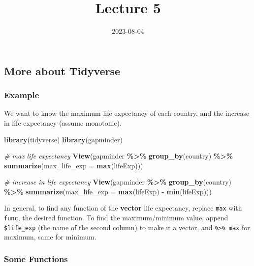 \documentclass[
]{article}
\title{Lecture 5}
\author{}
\date{\vspace{-2.5em}2023-08-04}
\newenvironment{Shaded}{\begin{snugshade}}{\end{snugshade}}
\newcommand{\AttributeTok}[1]{\textcolor[rgb]{0.13,0.29,0.53}{#1}}
\newcommand{\CommentTok}[1]{\textcolor[rgb]{0.56,0.35,0.01}{\textit{#1}}}
\newcommand{\FunctionTok}[1]{\textcolor[rgb]{0.13,0.29,0.53}{\textbf{#1}}}
\newcommand{\NormalTok}[1]{#1}
\newcommand{\SpecialCharTok}[1]{\textcolor[rgb]{0.81,0.36,0.00}{\textbf{#1}}}
\begin{document}
\maketitle

\hypertarget{more-about-tidyverse}{%
\subsection{More about Tidyverse}\label{more-about-tidyverse}}

\hypertarget{example}{%
\subsubsection{Example}\label{example}}

We want to know the maximum life expectancy of each country, and the
increase in life expectancy (assume monotonic).

\begin{Shaded}
\begin{Highlighting}[]
\FunctionTok{library}\NormalTok{(tidyverse)}
\FunctionTok{library}\NormalTok{(gapminder)}

\CommentTok{\# max life expectancy}
\FunctionTok{View}\NormalTok{(gapminder }\SpecialCharTok{\%\textgreater{}\%} \FunctionTok{group\_by}\NormalTok{(country) }\SpecialCharTok{\%\textgreater{}\%} \FunctionTok{summarize}\NormalTok{(}\AttributeTok{max\_life\_exp =} \FunctionTok{max}\NormalTok{(lifeExp)))}

\CommentTok{\# increase in life expectancy}
\FunctionTok{View}\NormalTok{(gapminder }\SpecialCharTok{\%\textgreater{}\%} \FunctionTok{group\_by}\NormalTok{(country)}
     \SpecialCharTok{\%\textgreater{}\%} \FunctionTok{summarize}\NormalTok{(}\AttributeTok{max\_life\_exp =} \FunctionTok{max}\NormalTok{(lifeExp) }\SpecialCharTok{{-}} \FunctionTok{min}\NormalTok{(lifeExp)))}
\end{Highlighting}
\end{Shaded}

In general, to find any function of the \textbf{vector} life expectancy,
replace \texttt{max} with \texttt{func}, the desired function. To find
the maximum/minimum value, append \texttt{\$life\_exp} (the name of the
second column) to make it a vector, and \texttt{\%\textgreater{}\%\ max}
for maximum, same for minimum.

\hypertarget{some-functions}{%
\subsubsection{Some Functions}\label{some-functions}}
\end{document}
